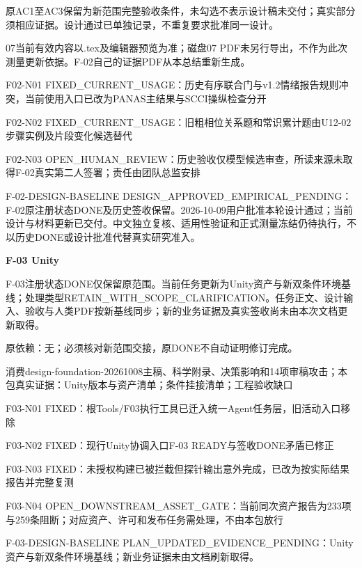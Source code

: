 \documentclass[11pt,a4paper]{article}
\newcommand{\reviewsection}[1]{\par\Needspace{5\baselineskip}\vspace{10pt}\begin{center}{\titlelatin\titlecjk\bfseries\fontsize{14}{20}\selectfont #1}\end{center}}
\begin{document}
原AC1至AC3保留为新范围完整验收条件，未勾选不表示设计稿未交付；真实部分须相应证据。设计通过已单独记录，不重复要求批准同一设计。


07当前有效内容以.tex及编辑器预览为准；磁盘07 PDF未另行导出，不作为此次测量更新依据。F-\allowbreak{}02自己的证据PDF从本总结重新生成。


F02-\allowbreak{}N01 FIXED\_\allowbreak{}CURRENT\_\allowbreak{}USAGE：历史有序联合门与v1.2情绪报告规则冲突，当前使用入口已改为PANAS主结果与SCCI操纵检查分开


F02-\allowbreak{}N02 FIXED\_\allowbreak{}CURRENT\_\allowbreak{}USAGE：旧粗相位关系题和常识累计题由U12-\allowbreak{}02步骤实例及片段变化候选替代


F02-\allowbreak{}N03 OPEN\_\allowbreak{}HUMAN\_\allowbreak{}REVIEW：历史验收仅模型候选审查，所读来源未取得F-\allowbreak{}02真实第二人签署；责任由团队总监安排


F-\allowbreak{}02-\allowbreak{}DESIGN-\allowbreak{}BASELINE DESIGN\_\allowbreak{}APPROVED\_\allowbreak{}EMPIRICAL\_\allowbreak{}PENDING：F-\allowbreak{}02原注册状态DONE及历史签收保留。2026-\allowbreak{}10-\allowbreak{}09用户批准本轮设计通过；当前设计与材料更新已交付。中文独立复核、适用性验证和正式测量冻结仍待执行，不以历史DONE或设计批准代替真实研究准入。


\reviewsection{F-\allowbreak{}03 Unity}
F-\allowbreak{}03注册状态DONE仅保留原范围。当前任务更新为Unity资产与新双条件环境基线；处理类型RETAIN\_\allowbreak{}WITH\_\allowbreak{}SCOPE\_\allowbreak{}CLARIFICATION。任务正文、设计输入、验收与人类PDF按新基线同步；新的业务证据及真实签收尚未由本次文档更新取得。


原依赖：无；必须核对新范围交接，原DONE不自动证明修订完成。


消费design-\allowbreak{}foundation-\allowbreak{}20261008主稿、科学附录、决策影响和14项审稿攻击；本包真实证据：Unity版本与资产清单；条件挂接清单；工程验收缺口


F03-\allowbreak{}N01 FIXED：根Tools/\allowbreak{}F03执行工具已迁入统一Agent任务层，旧活动入口移除


F03-\allowbreak{}N02 FIXED：现行Unity协调入口F-\allowbreak{}03 READY与签收DONE矛盾已修正


F03-\allowbreak{}N03 FIXED：未授权构建已被拦截但探针输出意外完成，已改为按实际结果报告并完整复测


F03-\allowbreak{}N04 OPEN\_\allowbreak{}DOWNSTREAM\_\allowbreak{}ASSET\_\allowbreak{}GATE：当前同次资产报告为233项与259条阻断；对应资产、许可和发布任务需处理，不由本包放行


F-\allowbreak{}03-\allowbreak{}DESIGN-\allowbreak{}BASELINE PLAN\_\allowbreak{}UPDATED\_\allowbreak{}EVIDENCE\_\allowbreak{}PENDING：Unity资产与新双条件环境基线；新业务证据未由文档刷新取得。
\end{document}
